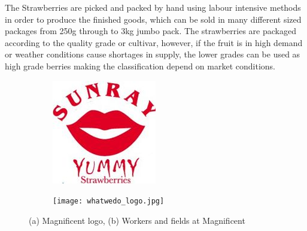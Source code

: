 \documentclass[fleqn,twoside]{article}
\begin{document}
The Strawberries are picked and packed by hand using labour intensive methods in order to produce the finished goods, which can be sold in many different sized packages from 250g through to 3kg jumbo pack. The strawberries are packaged according to the quality grade or cultivar, however, if the fruit is in high demand or weather conditions cause shortages in supply, the lower grades can be used as high grade berries making the classification depend on market conditions.

\begin{figure}[h]
	\centering
	\begin{subfigure}{.4\textwidth}
		\centering
		\includegraphics[width=.6\linewidth]{sunray.jpg}
		\caption{}
		\label{fig:sunray}
	\end{subfigure}%
	\begin{subfigure}{.6\textwidth}
		\centering
		\texttt{[image: whatwedo\_logo.jpg]}
		\caption{}
		\label{fig:whatwedo}
	\end{subfigure}%
	\caption{(a) Magnificent logo, (b) Workers and fields at Magnificent}
	\label{fig:test}
\end{figure}
\end{document}
